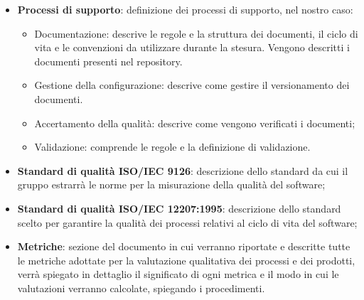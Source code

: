 \begin{itemize}
\begin{itemize}
            \item \textbf{Processi di supporto}: definizione dei processi di supporto, nel nostro caso:
            \begin{itemize}
                \item Documentazione: descrive le regole e la struttura dei documenti, il ciclo di vita e le convenzioni da utilizzare durante la stesura. Vengono descritti i documenti presenti nel repository.
                \item Gestione della configurazione: descrive come gestire il versionamento dei documenti.
                \item Accertamento della qualità: descrive come vengono verificati i documenti;
                \item Validazione: comprende le regole e la definizione di validazione.
            \end{itemize}
            \item \textbf{Standard di qualità ISO/IEC 9126}: descrizione dello standard da cui il gruppo estrarrà le norme per la misurazione della qualità del software;
            \item \textbf{Standard di qualità ISO/IEC 12207:1995}: descrizione dello standard scelto per garantire la qualità dei processi relativi al ciclo di vita del software;
            \item \textbf{Metriche}: sezione del documento in cui verranno riportate e descritte tutte le metriche adottate per la valutazione qualitativa dei processi e dei prodotti, verrà spiegato in dettaglio il significato di ogni metrica e il modo in cui le valutazioni verranno calcolate, spiegando i procedimenti.
             
        \end{itemize}
        \end{itemize}
